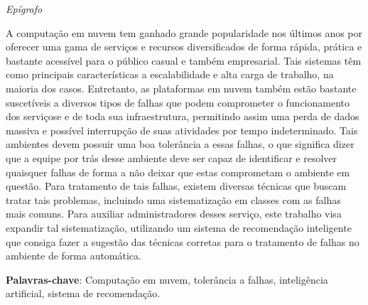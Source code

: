 \documentclass[
	12pt,				%
	a4paper,			%
	english,			%
	french,				%
	spanish,			%
	brazil				%
	]{abntex2}
\begin{document}


%
%

\begin{epigrafe}
    \vspace*{\fill}
	\begin{flushright}
		\textit{Epígrafo}
	\end{flushright}
\end{epigrafe}


\setlength{\absparsep}{18pt} %
\begin{resumo}
 A computação em nuvem tem ganhado grande popularidade nos últimos anos por oferecer uma gama de serviços e recursos diversificados de forma rápida, prática e bastante acessível para o público casual e também empresarial. Tais sistemas têm como principais características a escalabilidade e alta carga de trabalho, na maioria dos casos. Entretanto, as plataformas em nuvem também estão bastante suscetíveis a diversos tipos de falhas que podem comprometer o funcionamento dos serviçose e de toda sua infraestrutura, permitindo assim uma perda de dados massiva e possível interrupção de suas atividades por tempo indeterminado. Tais ambientes devem possuir uma boa tolerância a essas falhas, o que significa dizer que a equipe por trás desse ambiente deve ser capaz de identificar e resolver quaisquer falhas de forma a não deixar que estas comprometam o ambiente em questão. Para tratamento de tais falhas, existem diversas técnicas que buscam tratar tais problemas, incluindo uma sistematização em classes com as falhas mais comuns. Para auxiliar administradores desses serviço, este trabalho visa expandir tal sistematização, utilizando um sistema de recomendação inteligente que consiga fazer a sugestão das técnicas corretas para o tratamento de falhas no ambiente de forma automática.

 \textbf{Palavras-chave}: Computação em nuvem, tolerância a falhas, inteligência artificial, sistema de recomendação.
\end{resumo}
\end{document}
